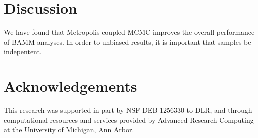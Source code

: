 \documentclass[12pt]{article}
\begin{document}
\section*{Discussion}

We have found that Metropolis-coupled MCMC improves
the overall performance of BAMM analyses.
%
In order to unbiased results,
it is important that samples be indepentent.


\section*{Acknowledgements}
This research was supported in part by 
NSF-DEB-1256330 to DLR, and through computational resources
and services provided by Advanced Research Computing
at the University of Michigan, Ann Arbor. 



\end{document}

